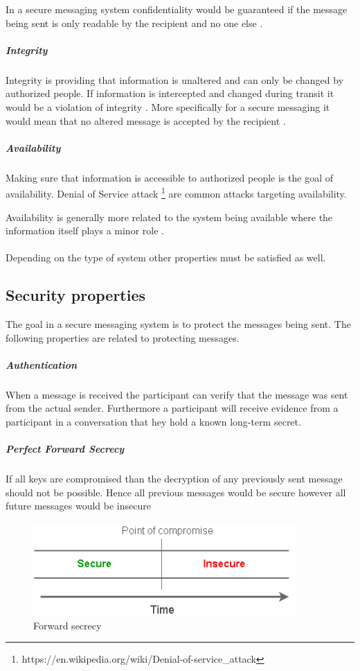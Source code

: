 In a secure messaging system confidentiality would be guaranteed if the message being sent is only readable by the recipient and no one else \cite{sok}.

\subparagraph{Integrity}
Integrity is providing that information is unaltered and can only be changed by authorized people. If information is intercepted and changed during transit it would be a violation of integrity \cite{michael2012}.  
More specifically for a secure messaging it would mean that no altered message is accepted by the recipient \cite{sok}.

\subparagraph{Availability}
Making sure that information is accessible to authorized people is the goal of availability. Denial of Service attack \footnote{https://en.wikipedia.org/wiki/Denial-of-service\_attack} are common attacks targeting availability. 

Availability is generally more related to the system being available where the information itself plays a minor role \cite{michael2012}.
\\
\\
Depending on the type of system other properties must be satisfied as well. 


\subsection{Security properties}
The goal in a secure messaging system is to protect the messages being sent. The following properties are related to protecting messages.


\subparagraph{Authentication}
When a message is received the participant can verify that the message was sent from the actual sender. Furthermore a participant will receive evidence from a participant in a conversation that hey hold a known long-term secret. 



\subparagraph{Perfect Forward Secrecy}
If all keys are compromised than the decryption of any previously sent message should not be possible. Hence all previous messages would be secure however all future messages would be insecure 

\begin{figure}[H]
	\centering
	\includegraphics[width=10cm]{figures/forwardsecrecy.png}
	\caption{Forward secrecy}
	\label{fig:forward}
\end{figure}

